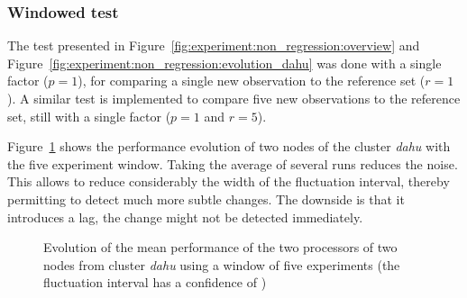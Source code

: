             \subsubsection{Windowed test}%

                The test presented in Figure~\ref{fig:experiment:non_regression:overview} and
                Figure~\ref{fig:experiment:non_regression:evolution_dahu} was done with a single factor (\(p=1\)), for
                comparing a single new observation to the reference set (\(r=1\)). A similar test is implemented to
                compare five new observations to the reference set, still with a single factor (\(p=1\) and \(r=5\)).

                Figure~\ref{fig:experiment:non_regression:evolution_dahu_windowed} shows the performance evolution of
                two nodes of the cluster \emph{dahu} with the five experiment window. Taking the average of several runs
                reduces the noise. This allows to reduce considerably the width of the fluctuation interval, thereby
                permitting to detect much more subtle changes. The downside is that it introduces a lag, the change
                might not be detected immediately.

                \begin{figure}[htpb]
                    \centering
                    \caption{Evolution of the mean performance of the two processors of two nodes from cluster
                    \emph{dahu} using a window of five experiments (the fluctuation interval has a confidence of
                    )}%
                    \label{fig:experiment:non_regression:evolution_dahu_windowed}
                \end{figure}

